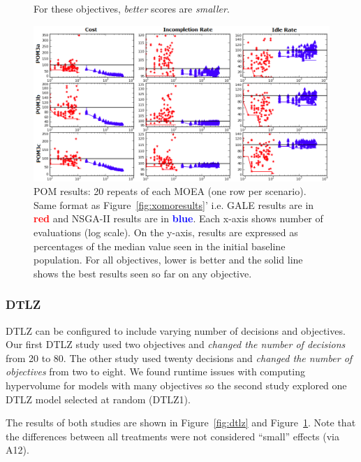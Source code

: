 \documentclass[10pt,journal,compsoc]{IEEEtran}
\newcommand{\fig}[1]{Figure~\ref{fig:#1}}
\newenvironment{changed}{\par}{\par}
\newcommand{\addit}[1]{\begin{changed}\end{changed}}
\begin{document}
\begin{changed}
\begin{figure}[!t]
{For these objectives, {\em better} scores are {\em smaller}.
}\label{fig:o2468}
\end{figure}
 \addit{xomoresults}
\begin{figure}[!t]
 \includegraphics[width=7in]{figures/figure_analytics_obj_score_plots.png}
\caption{POM results: 20 repeats of each MOEA (one row
per scenario). Same format as \fig{xomoresults}' i.e.
GALE results are in 
\textcolor{red}{{\bf red}}
and NSGA-II results are in 
 \textcolor{blue}{{\bf blue}}. Each x-axis shows number of evaluations (log scale).
On the y-axis, results are expressed
as percentages of the median value seen in the  initial baseline population. 
For all objectives, lower is better and the solid line shows
the best results seen so far on any objective.    }
\label{fig:zdt1objspace}
\end{figure}




\subsubsection{DTLZ}

 DTLZ  can be configured to include varying number of decisions
and objectives.  
Our first DTLZ study used two objectives and  {\em changed the number of decisions} from 20 to 80. The other study used twenty decisions and  {\em changed
the number of objectives} from two to eight. We found
 runtime issues with  computing hypervolume for models with many objectives
 so  the  second study  explored one DTLZ model selected at random (DTLZ1).

The results of both studies are shown in \fig{dtlz}
and \fig{o2468}. Note that the differences
between all treatments were not considered ``small'' effects (via A12).


\end{changed}
\end{document}
